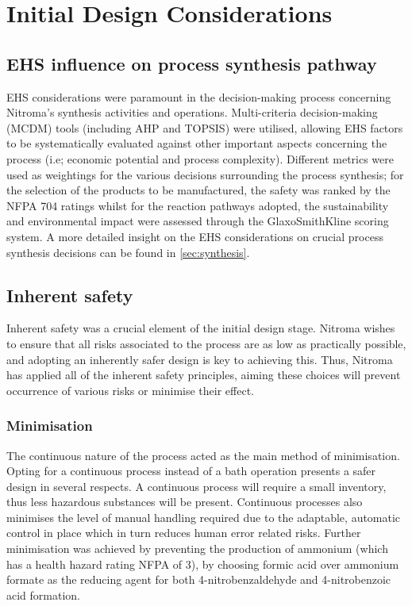 
\section{Initial Design Considerations}

\subsection{EHS influence on process synthesis pathway}

EHS considerations were paramount in the decision-making process concerning Nitroma’s synthesis activities and operations. Multi-criteria decision-making (MCDM) tools (including AHP and TOPSIS) were utilised, allowing EHS factors to be systematically evaluated against other important aspects concerning the process (i.e; economic potential and process complexity). Different metrics were used as weightings for the various decisions surrounding the process synthesis; for the selection of the products to be manufactured, the safety was ranked by the NFPA 704 ratings whilst for the reaction pathways adopted, the sustainability and environmental impact were assessed through the GlaxoSmithKline scoring system. A more detailed insight on the EHS considerations on crucial process synthesis decisions can be found in \cref{sec:synthesis}. 

\subsection{Inherent safety}

Inherent safety was a crucial element of the initial design stage. Nitroma wishes to ensure that all risks associated to the process are as low as practically possible, and adopting an inherently safer design is key to achieving this. Thus, Nitroma has applied all of the inherent safety principles, aiming these choices will prevent occurrence of various risks or minimise their effect.

\subsubsection{Minimisation}
The continuous nature of the process acted as the main method of minimisation. Opting for a continuous process instead of a bath operation presents a safer design in several respects. A continuous process will require a small inventory, thus less hazardous substances will be present. Continuous processes also minimises the level of manual handling required due to the adaptable, automatic control in place which in turn reduces human error related risks. 
Further minimisation was achieved by preventing the production of ammonium (which has a health hazard rating NFPA of 3), by choosing formic acid over ammonium formate as the reducing agent for both 4-nitrobenzaldehyde and 4-nitrobenzoic acid formation. 



